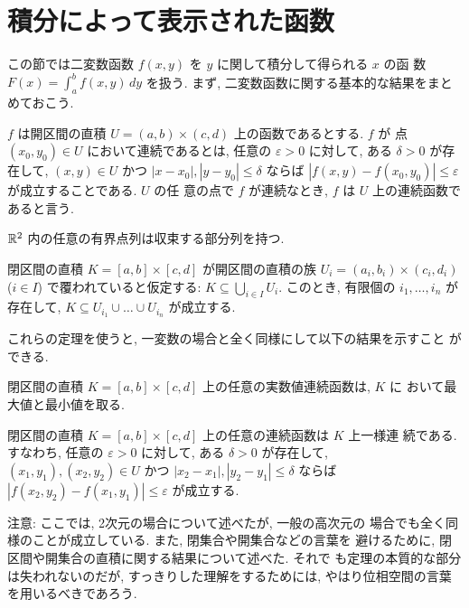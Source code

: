 \documentclass[12pt,twoside]{jarticle}
\begin{document}
\section{積分によって表示された函数}

この節では二変数函数 $f(x,y)$ を $y$ に関して積分して得られる $x$ の函
数 $F(x) = \int_a^b f(x,y)\,dy$ を扱う. 
まず, 二変数函数に関する基本的な結果をまとめておこう.

\begin{Definition}[連続性]
  $f$ は開区間の直積 $U=(a,b)\times(c,d)$ 上の函数であるとする. $f$ が
  点 $(x_0,y_0)\in U$ において連続であるとは, 任意の $\varepsilon > 0$%
  に対して, ある $\delta > 0$ が存在して, $(x,y)\in U$ かつ %
  $|x -x_0|,|y-y_0| \le \delta$ ならば %
  $|f(x,y)-f(x_0,y_0)| \le \varepsilon$ が成立することである. $U$ の任
  意の点で $f$ が連続なとき, $f$ は $U$ 上の連続函数であると言う.
\end{Definition}

\begin{Theorem}
  ${\mathbb R}^2$ 内の任意の有界点列は収束する部分列を持つ.
\end{Theorem}

\begin{Theorem}
  閉区間の直積 $K=[a,b]\times[c,d]$ が開区間の直積の族 %
  $U_i=(a_i,b_i)\times(c_i,d_i)$ ($i\in I$) で覆われていると仮定する:%
  $K \subseteq \bigcup\limits_{i\in I} U_i$. このとき, 有限個の %
  $i_1,\ldots,i_n$ が存在して, %
  $K \subseteq U_{i_1}\cup\dots\cup U_{i_n}$ が成立する.
\end{Theorem}

これらの定理を使うと, 一変数の場合と全く同様にして以下の結果を示すこと
ができる.

\begin{Theorem}
  閉区間の直積 $K=[a,b]\times[c,d]$ 上の任意の実数値連続函数は, $K$ に
  おいて最大値と最小値を取る.
\end{Theorem}

\begin{Theorem}
  閉区間の直積 $K=[a,b]\times[c,d]$ 上の任意の連続函数は $K$ 上一様連
  続である. すなわち, 任意の $\varepsilon > 0$ に対して, %
  ある $\delta > 0$ が存在して, %
  $(x_1,y_1),(x_2,y_2) \in U$ かつ %
  $|x_2 - x_1|,|y_2 - y_1| \le \delta$ ならば %
  $|f(x_2,y_2)-f(x_1,y_1)| \le \varepsilon$ が成立する.
\end{Theorem}

\noindent 注意: ここでは, 2次元の場合について述べたが, 一般の高次元の
場合でも全く同様のことが成立している. また, 閉集合や開集合などの言葉を
避けるために, 閉区間や開集合の直積に関する結果について述べた.  それで
も定理の本質的な部分は失われないのだが, すっきりした理解をするためには, 
やはり位相空間の言葉を用いるべきであろう.
\end{document}
